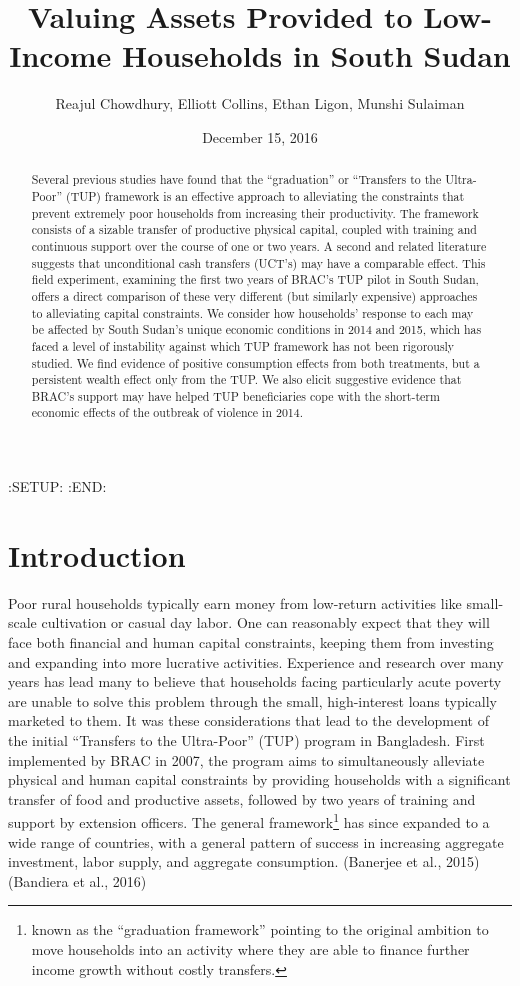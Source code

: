 \documentclass[12pt,article]{article}
\author{Reajul Chowdhury, Elliott Collins, Ethan Ligon, Munshi Sulaiman}
\date{December 15, 2016}
\title{Valuing Assets Provided to Low-Income Households in South Sudan}
\begin{document}
\maketitle
:SETUP:    
:END:

\begin{abstract}


Several previous studies have found that the ``graduation'' or ``Transfers to the
Ultra-Poor'' (TUP) framework is an effective approach to alleviating the constraints
that prevent extremely poor households from increasing their productivity. The
framework consists of a sizable transfer of productive physical capital, coupled with
training and continuous support over the course of one or two years. A second and
related literature suggests that unconditional cash transfers (UCT's) may have a
comparable effect. This field experiment, examining the first two years of BRAC's TUP
pilot in South Sudan, offers a direct comparison of these very different (but
similarly expensive) approaches to alleviating capital constraints. We consider how
households' response to each may be affected by South Sudan's unique economic
conditions in 2014 and 2015, which has faced a level of instability against which TUP
framework has not been rigorously studied. We find evidence of positive consumption
effects from both treatments, but a persistent wealth effect only from the TUP. We
also elicit suggestive evidence that BRAC's support may have helped TUP beneficiaries
cope with the short-term economic effects of the outbreak of violence in 2014.
\end{abstract}
\newpage

\section{Introduction}
\label{sec-1}

Poor rural households typically earn money from low-return activities like
small-scale cultivation or casual day labor. One can reasonably expect that they will
face both financial and human capital constraints, keeping them from investing 
and expanding into more lucrative activities. Experience and research over many years
has lead many to believe that households facing particularly acute poverty are unable
to solve this problem through the small, high-interest loans typically marketed to
them. It was these considerations that lead to the development of the initial
``Transfers to the Ultra-Poor'' (TUP) program in Bangladesh. First implemented by
BRAC in 2007, the program aims to simultaneously alleviate physical and human capital
constraints by providing households with a significant transfer of food and productive assets,
followed by two years of training and support by extension officers. The general
framework\footnote{known as the ``graduation framework'' pointing to the original
ambition to move households into an activity where they are able to finance further
income growth without costly transfers.}
has since expanded to a wide range of countries, with a general pattern of
success in increasing aggregate investment, labor supply, and aggregate consumption.
(Banerjee et al., 2015) (Bandiera et al., 2016)
\end{document}
